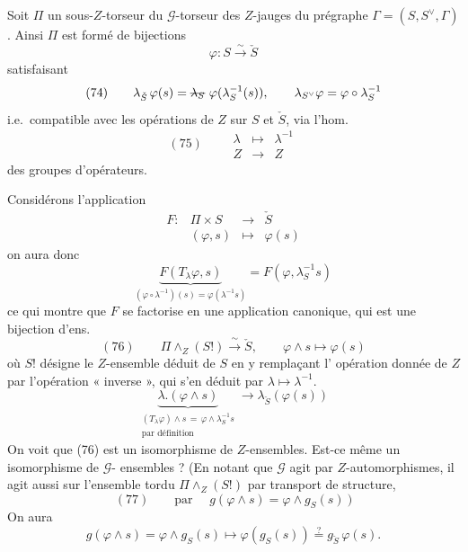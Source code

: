 \documentclass[11pt,a4paper]{article}
\begin{document}
Soit $\Pi$ un sous-$Z$-torseur du $\mathcal{G}$-torseur des $Z$-jauges du
prégraphe $\Gamma = (S, S^{\vee}, \Gamma)$. Ainsi $\Pi$ est formé de bijections
\[
\varphi : S \xrightarrow{\ \sim\ } \check{S}
\]
satisfaisant
\[
(74)\qquad \lambda_{\check{S}}\, \varphi(s) = \text{\struck{$\lambda_S$}}\ \varphi(\lambda_S^{-1}(s)), \qquad
\lambda_{S^{\vee}} \varphi = \varphi \circ \lambda_S^{-1}
\]
i.e.\ compatible avec les opérations de $Z$ sur $S$ et $\check{S}$, via
l'hom.
\[
(75)\qquad
\begin{array}{ccc}
\lambda & \longmapsto & \lambda^{-1} \\
Z & \longrightarrow & Z
\end{array}
\]
des groupes d'opérateurs. 

Considérons l'application
\[
\begin{array}{rccl}
F : & \Pi \times S & \longrightarrow & \check{S} \\
& (\varphi, s) & \longmapsto & \varphi(s)
\end{array}
\]
on aura donc
\[
\underbrace{F(T_\lambda \varphi, s)}_{(\varphi \circ \lambda^{-1})(s) = \varphi(\lambda^{-1} s)} = F(\varphi, \lambda_S^{-1} s)
\]
ce qui montre que $F$ se factorise en une application canonique, qui est une
bijection d'ens.
\[
(76)\qquad \Pi \wedge_Z (S!) \xrightarrow{\ \sim\ } \check{S}, \qquad \varphi \wedge s \longmapsto \varphi(s)
\]
où $S!$ désigne le $Z$-ensemble déduit de $S$ en y remplaçant
l'\struck{\ill{}} opération donnée de $Z$ par l'opération « inverse »,
 qui s'en déduit par $\lambda \mapsto \lambda^{-1}$.
\[
\underbrace{\lambda . (\varphi \wedge s)}_{\substack{(T_\lambda \varphi) \wedge s \,=\, \varphi \wedge \lambda_S^{-1} s \\ \text{par définition}}} \longrightarrow \lambda_{\check{S}}(\varphi(s))
\]
On voit que (76) est un isomorphisme de $Z$-ensembles. \struck{\ill{}} Est-ce
même un isomorphisme de $\mathcal{G}$- ensembles ? (En notant
que $\mathcal{G}$ agit  par $Z$-automorphismes, il agit aussi
sur l'ensemble tordu $\Pi \wedge_Z (S!)$ par transport de structure,
\[
(77)\qquad \text{par } \quad g(\varphi \wedge s) = \varphi \wedge g_S(s)\ )
\]
On aura
\[
g(\varphi \wedge s) = \varphi \wedge g_S(s) \longmapsto \varphi(g_S(s)) \overset{?}{=} g_{\check{S}}\, \varphi(s) .
\]
\end{document}

